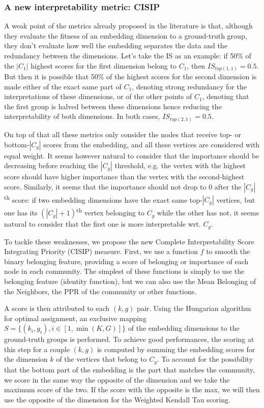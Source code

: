 \subsubsection{A new interpretability metric: CISIP}

A weak point of the metrics already proposed in the literature is that, although they evaluate the fitness of an embedding dimension to a ground-truth group, they don't evaluate how well the embedding separates the data and the redundancy between the dimensions. Let's take the IS as an example: if 50\% of the $|C_1|$ highest scores for the first dimension belong to $C_1$, then $IS_{top(1,1)} = 0.5$. But then it is possible that 50\% of the highest scores for the second dimension is made either of the exact same part of $C_1$, denoting strong redundancy for the interpretations of these dimensions, or of the other points of $C_1$, denoting that the first group is halved between these dimensions hence reducing the interpretability of both dimensions. In both cases, $IS_{top(2, 1)} = 0.5$.

On top of that all these metrics only consider the nodes that receive top- or bottom-$|C_g|$ scores from the embedding, and all these vertices are considered with equal weight. It seems however natural to consider that the importance should be decreasing before reaching the $|C_g|$ threshold, e.g. the vertex with the highest score should have higher importance than the vertex with the second-highest score. Similarly, it seems that the importance should not drop to 0 after the $|C_g|$\textsuperscript{th} score: if two embedding dimensions have the exact same top-$|C_g|$ vertices, but one has its $(|C_g|+1)$\textsuperscript{th} vertex belonging to $C_g$ while the other has not, it seems natural to consider that the first one is more interpretable wrt. $C_g$. 

To tackle these weaknesses, we propose the new Complete Interpretability Score Integrating Priority (CISIP) measure. First, we use a function $f$ to smooth the binary belonging feature, providing a score of belonging or importance of each node in each community. The simplest of these functions is simply to use the belonging feature (identity function), but we can also use the Mean Belonging of the Neighbors, the PPR of the community or other functions.

A score is then attributed to each $(k, g)$ pair. Using the Hungarian algorithm for optimal assignment, an exclusive mapping $S = \{(k_i, g_i), i \in [1, \min(K, G)]\}$ of the embedding dimensions to the ground-truth groups is performed. To achieve good performances, the scoring at this step for a couple $(k, g)$ is computed by summing the embedding scores for the dimension $k$ of the vertices that belong to $C_g$. To account for the possibility that the bottom part of the embedding is the part that matches the community, we score in the same way the opposite of the dimension and we take the maximum score of the two. If the score with the opposite is the max, we will then use the opposite of the dimension for the Weighted Kendall Tau scoring.

